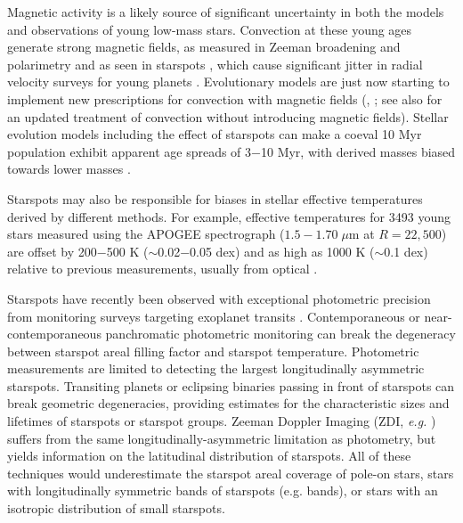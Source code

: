 \documentclass[twocolumn]{emulateapj}%
\begin{document}
Magnetic activity is a likely source of significant uncertainty in both the models and observations of young low-mass stars. Convection at these young ages generate strong magnetic fields, as measured in Zeeman broadening and polarimetry \citep[e.g.][]{johnskrull07,donati09} and as seen in starspots \citep[e.g.][]{stauffer03,grankin08}, which cause significant jitter in radial velocity surveys for young planets \citep[e.g.][]{donati14}.  Evolutionary models are just now starting to implement new prescriptions for convection with magnetic fields (\citet{somers15}, \citet{feiden16}; see also \citet{baraffe15} for an updated treatment of convection without introducing magnetic fields).  Stellar evolution models including the effect of starspots can make a coeval 10 Myr population exhibit apparent age spreads of 3$-$10 Myr, with derived masses biased towards lower masses \citep{somers15}.  

Starspots may also be responsible for biases in stellar effective temperatures derived by different methods.  For example, effective temperatures for 3493 young stars measured using the APOGEE spectrograph ($1.5-1.70 \;\mu$m at $R=22,500$) are offset by 200$-$500 K ($\sim$0.02$-$0.05 dex) and as high as 1000 K ($\sim$0.1 dex) relative to previous measurements, usually from optical \citep{cottaar14}.  



Starspots have recently been observed with exceptional photometric precision from monitoring surveys targeting exoplanet transits \citep{harrison11,davenport15}.  Contemporaneous or near-contemporaneous panchromatic photometric monitoring \citep{bouvier95,grankin07} can break the degeneracy between starspot areal filling factor and starspot temperature. Photometric measurements are limited to detecting the largest longitudinally asymmetric starspots.  Transiting planets or eclipsing binaries passing in front of starspots \citep{desert11} can break geometric degeneracies, providing estimates for the characteristic sizes and lifetimes of starspots or starspot groups.  Zeeman Doppler Imaging (ZDI, \emph{e.g.} \citet{donati14}) suffers from the same longitudinally-asymmetric limitation as photometry, but yields information on the latitudinal distribution of starspots.  All of these techniques would underestimate the starspot areal coverage of pole-on stars, stars with longitudinally symmetric bands of starspots (e.g. bands), or stars with an isotropic distribution of small starspots.  
\end{document}
